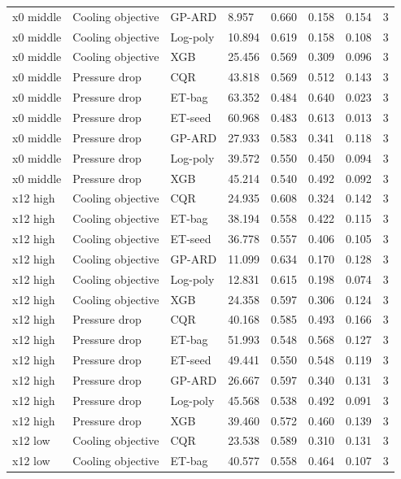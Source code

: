 \begin{longtable}{llllllll}
x0 middle & Cooling objective & GP-ARD & 8.957 & 0.660 & 0.158 & 0.154 & 3\\
x0 middle & Cooling objective & Log-poly & 10.894 & 0.619 & 0.158 & 0.108 & 3\\
x0 middle & Cooling objective & XGB & 25.456 & 0.569 & 0.309 & 0.096 & 3\\
x0 middle & Pressure drop & CQR & 43.818 & 0.569 & 0.512 & 0.143 & 3\\
x0 middle & Pressure drop & ET-bag & 63.352 & 0.484 & 0.640 & 0.023 & 3\\
x0 middle & Pressure drop & ET-seed & 60.968 & 0.483 & 0.613 & 0.013 & 3\\
x0 middle & Pressure drop & GP-ARD & 27.933 & 0.583 & 0.341 & 0.118 & 3\\
x0 middle & Pressure drop & Log-poly & 39.572 & 0.550 & 0.450 & 0.094 & 3\\
x0 middle & Pressure drop & XGB & 45.214 & 0.540 & 0.492 & 0.092 & 3\\
x12 high & Cooling objective & CQR & 24.935 & 0.608 & 0.324 & 0.142 & 3\\
x12 high & Cooling objective & ET-bag & 38.194 & 0.558 & 0.422 & 0.115 & 3\\
x12 high & Cooling objective & ET-seed & 36.778 & 0.557 & 0.406 & 0.105 & 3\\
x12 high & Cooling objective & GP-ARD & 11.099 & 0.634 & 0.170 & 0.128 & 3\\
x12 high & Cooling objective & Log-poly & 12.831 & 0.615 & 0.198 & 0.074 & 3\\
x12 high & Cooling objective & XGB & 24.358 & 0.597 & 0.306 & 0.124 & 3\\
x12 high & Pressure drop & CQR & 40.168 & 0.585 & 0.493 & 0.166 & 3\\
x12 high & Pressure drop & ET-bag & 51.993 & 0.548 & 0.568 & 0.127 & 3\\
x12 high & Pressure drop & ET-seed & 49.441 & 0.550 & 0.548 & 0.119 & 3\\
x12 high & Pressure drop & GP-ARD & 26.667 & 0.597 & 0.340 & 0.131 & 3\\
x12 high & Pressure drop & Log-poly & 45.568 & 0.538 & 0.492 & 0.091 & 3\\
x12 high & Pressure drop & XGB & 39.460 & 0.572 & 0.460 & 0.139 & 3\\
x12 low & Cooling objective & CQR & 23.538 & 0.589 & 0.310 & 0.131 & 3\\
x12 low & Cooling objective & ET-bag & 40.577 & 0.558 & 0.464 & 0.107 & 3\\

\end{longtable}
